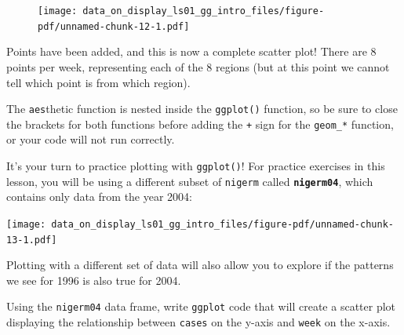 \documentclass[
  letterpaper,
  DIV=11,
  numbers=noendperiod]{scrreprt}
\begin{document}
\begin{figure}[H]

{\centering \texttt{[image: data\_on\_display\_ls01\_gg\_intro\_files/figure-pdf/unnamed-chunk-12-1.pdf]}

}

\end{figure}

Points have been added, and this is now a complete scatter plot! There
are 8 points per week, representing each of the 8 regions (but at this
point we cannot tell which point is from which region).

\begin{tcolorbox}[enhanced jigsaw, colframe=quarto-callout-note-color-frame, colbacktitle=quarto-callout-note-color!10!white, titlerule=0mm, opacitybacktitle=0.6, breakable, toprule=.15mm, arc=.35mm, rightrule=.15mm, colback=white, bottomrule=.15mm, opacityback=0, toptitle=1mm, left=2mm, bottomtitle=1mm, title=\textcolor{quarto-callout-note-color}{\faInfo}\hspace{0.5em}{Reminder}, leftrule=.75mm, coltitle=black]

The \texttt{aes}thetic function is nested inside the \texttt{ggplot()}
function, so be sure to close the brackets for both functions before
adding the \texttt{+} sign for the \texttt{geom\_*} function, or your
code will not run correctly.

\end{tcolorbox}

It's your turn to practice plotting with \texttt{ggplot()}! For practice
exercises in this lesson, you will be using a different subset of
\texttt{nigerm} called \textbf{\texttt{nigerm04}}, which contains only
data from the year 2004:

\texttt{[image: data\_on\_display\_ls01\_gg\_intro\_files/figure-pdf/unnamed-chunk-13-1.pdf]}

Plotting with a different set of data will also allow you to explore if
the patterns we see for 1996 is also true for 2004.

\begin{tcolorbox}[enhanced jigsaw, colframe=quarto-callout-tip-color-frame, colbacktitle=quarto-callout-tip-color!10!white, titlerule=0mm, opacitybacktitle=0.6, breakable, toprule=.15mm, arc=.35mm, rightrule=.15mm, colback=white, bottomrule=.15mm, opacityback=0, toptitle=1mm, left=2mm, bottomtitle=1mm, title=\textcolor{quarto-callout-tip-color}{\faLightbulb}\hspace{0.5em}{Practice}, leftrule=.75mm, coltitle=black]

Using the \texttt{nigerm04} data frame, write \texttt{ggplot} code that
will create a scatter plot displaying the relationship between
\texttt{cases} on the y-axis and \texttt{week} on the x-axis.

\end{tcolorbox}
\end{document}
